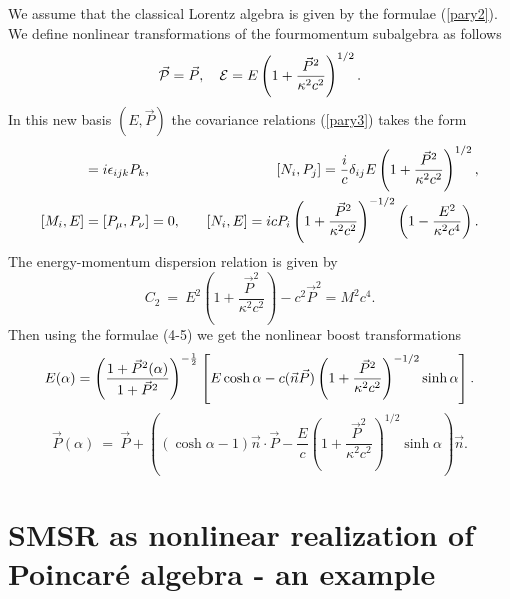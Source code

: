 \documentclass[a4paper,12pt]{article} \usepackage{times}
\begin{document}
We assume that the classical Lorentz algebra is given by the
formulae (\ref{pary2}). We define nonlinear transformations of the
 fourmomentum subalgebra as follows
\begin{equation}
\vec{\cal{P}}  =  \vec{P} ,\quad {\cal{E}} =  E \left(1 +
\frac{\vec{P}^2}{\kappa^2 c^2}\right)^{1/2} .
\end{equation}
In this new basis $(E, \vec{P})$ the covariance relations
(\ref{pary3}) takes the form
\begin{eqnarray}
[M_i, P_j]& =  i\epsilon_{ijk} P_k , \quad & [N_i,P_j] = {i\over
c} \delta_{ij} E \left(1 + \frac{\vec{P}^2}{\kappa^2
c^2}\right)^{1/2} ,\cr [M_i,E]& = [P_\mu, P_\nu] = 0 ,\quad  &
[N_i, E] = i c P_i \left(1 + \frac{\vec{P}^2}{\kappa^2
c^2}\right)^{-1/2}\left(1 - \frac{E^2}{\kappa^2 c^4}\right) .
\end{eqnarray}
The energy-momentum dispersion relation is given by
\begin{equation}
C_2 \ = \ E^2 \left(1 + \frac{\vec{P}^2}{\kappa^2 c^2}\right) -
c^2 \vec{P}^2 = M^2 c^4 .
\end{equation}
Then using the formulae (4-5) we get the  nonlinear boost
transformations
\begin{eqnarray}
E(\alpha) = \left(\frac{1+\vec{P}^2(\alpha)}{1 +
\vec{P}^2}\right)^{-{1\over 2}}\left[E\cosh \alpha -c
(\vec{n}\vec{P})\left(1 + \frac{\vec{P}^2}{\kappa^2
c^2}\right)^{-1/2} \sinh\alpha\right].\end{eqnarray}
\begin{equation}
\vec{P}(\alpha) \ = \ \vec{P} +
\left((\cosh\alpha-1)\vec{n}\cdot\vec{P} - \frac{E}{c}\left(1 +
\frac{\vec{P}^2}{\kappa^2 c^2}\right)^{1/2}
\sinh\alpha\right)\vec{n} .
\end{equation}


\section{SMSR as nonlinear realization of Poincar\'{e}
algebra - an example}
\end{document}
